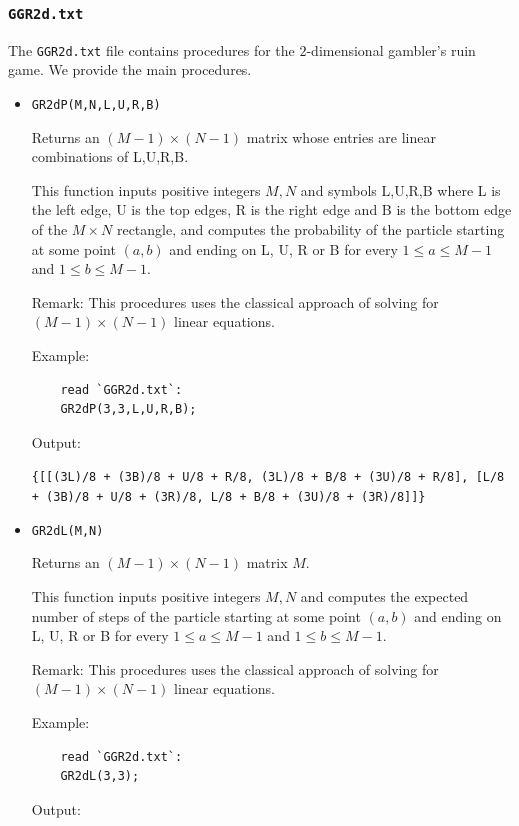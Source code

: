 \documentclass[reqno]{amsart}
\theoremstyle{definition}
\theoremstyle{definition}
\theoremstyle{remark}
\begin{document}
\subsubsection{\lstinline{GGR2d.txt}}\label{appendix:ggr2d}
The \lstinline{GGR2d.txt} file contains procedures for the $2$-dimensional gambler's ruin game. We provide the main procedures.

\begin{itemize}
\item \lstinline{GR2dP(M,N,L,U,R,B)}

    Returns an $(M-1) \times (N-1)$ matrix whose entries are linear combinations of L,U,R,B.
    
    This function inputs positive integers $M, N$ and symbols L,U,R,B where L is the left edge, U is the top edges, R is the right edge and B is the bottom edge of the $M\times N$ rectangle, and computes the probability of the particle starting at some point $(a,b)$ and ending on L, U, R or B for every $1\leq a \leq M-1$ and $1\leq b \leq M-1$.

    Remark: This procedures uses the classical approach of solving for $(M-1)\times(N-1)$ linear equations.

    Example:
    
    \begin{lstlisting}
    read `GGR2d.txt`:
    GR2dP(3,3,L,U,R,B);
    \end{lstlisting}
    Output:
    
    \lstinline!{[[(3L)/8 + (3B)/8 + U/8 + R/8, (3L)/8 + B/8 + (3U)/8 + R/8], [L/8 + (3B)/8 + U/8 + (3R)/8, L/8 + B/8 + (3U)/8 + (3R)/8]]}!

    \item \lstinline{GR2dL(M,N)}
    
    Returns an $(M-1)\times (N-1)$ matrix $M$.
    
    This function inputs positive integers $M, N$ and computes the expected number of steps of the particle starting at some point $(a,b)$ and ending on L, U, R or B for every $1\leq a \leq M-1$ and $1\leq b \leq M-1$.

     Remark: This procedures uses the classical approach of solving for $(M-1)\times(N-1)$ linear equations.
    
    Example:
    
    \begin{lstlisting}
    read `GGR2d.txt`:
    GR2dL(3,3);
    \end{lstlisting}
    Output:
    

\end{itemize}
\end{document}
